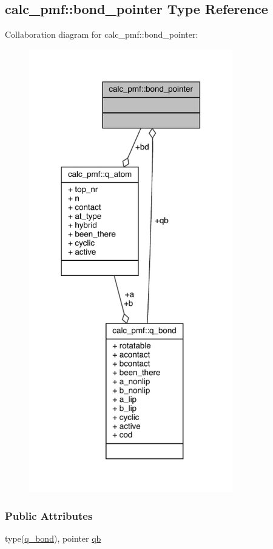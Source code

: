 \hypertarget{structcalc__pmf_1_1bond__pointer}{\subsection{calc\-\_\-pmf\-:\-:bond\-\_\-pointer Type Reference}
\label{structcalc__pmf_1_1bond__pointer}
}


Collaboration diagram for calc\-\_\-pmf\-:\-:bond\-\_\-pointer\-:
\nopagebreak
\begin{figure}[H]
\begin{center}
\leavevmode
\includegraphics[width=251pt]{structcalc__pmf_1_1bond__pointer__coll__graph}
\end{center}
\end{figure}
\subsubsection*{Public Attributes}
\begin{DoxyCompactItemize}
\item 
type(\hyperlink{structcalc__pmf_1_1q__bond}{q\-\_\-bond}), pointer \hyperlink{structcalc__pmf_1_1bond__pointer_a8ab7347a04f1d537a50e9162bc1e63ba}{qb}
\end{DoxyCompactItemize}


